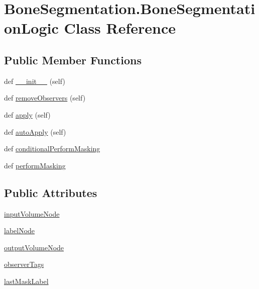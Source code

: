 \hypertarget{class_bone_segmentation_1_1_bone_segmentation_logic}{}\section{Bone\+Segmentation.\+Bone\+Segmentation\+Logic Class Reference}
\label{class_bone_segmentation_1_1_bone_segmentation_logic}
\subsection*{Public Member Functions}
\begin{DoxyCompactItemize}
\item 
def \hyperlink{class_bone_segmentation_1_1_bone_segmentation_logic_ad0fafb363305a4b4a1c8ea0a87366e35}{\+\_\+\+\_\+init\+\_\+\+\_\+} (self)
\item 
def \hyperlink{class_bone_segmentation_1_1_bone_segmentation_logic_a42be9247b24fb7bb54b13192270a591a}{remove\+Observers} (self)
\item 
def \hyperlink{class_bone_segmentation_1_1_bone_segmentation_logic_a624ecdd90750a0734bf1a4e2f6741b0e}{apply} (self)
\item 
def \hyperlink{class_bone_segmentation_1_1_bone_segmentation_logic_ab8b4b5d13113e270d50180c6df5a1ef8}{auto\+Apply} (self)
\item 
def \hyperlink{class_bone_segmentation_1_1_bone_segmentation_logic_a26d4d3573ca3e18d23f38da1b12bc114}{conditional\+Perform\+Masking}
\item 
def \hyperlink{class_bone_segmentation_1_1_bone_segmentation_logic_a9e1fe441e98bd8645c8f4c0228085f2c}{perform\+Masking}
\end{DoxyCompactItemize}
\subsection*{Public Attributes}
\begin{DoxyCompactItemize}
\item 
\hyperlink{class_bone_segmentation_1_1_bone_segmentation_logic_a7249c35b21308e8010b26106a11e244e}{input\+Volume\+Node}
\item 
\hyperlink{class_bone_segmentation_1_1_bone_segmentation_logic_aa5507f8f268b711b186df8c74a4b9583}{label\+Node}
\item 
\hyperlink{class_bone_segmentation_1_1_bone_segmentation_logic_a2d6bb5dea3368d499007ccfbcc4c1ecc}{output\+Volume\+Node}
\item 
\hyperlink{class_bone_segmentation_1_1_bone_segmentation_logic_a33fd5044dde775bd35d754df789123f1}{observer\+Tags}
\item 
\hyperlink{class_bone_segmentation_1_1_bone_segmentation_logic_ae4725ea90e295cc00dab5cab11a0a646}{last\+Mask\+Label}
\end{DoxyCompactItemize}


